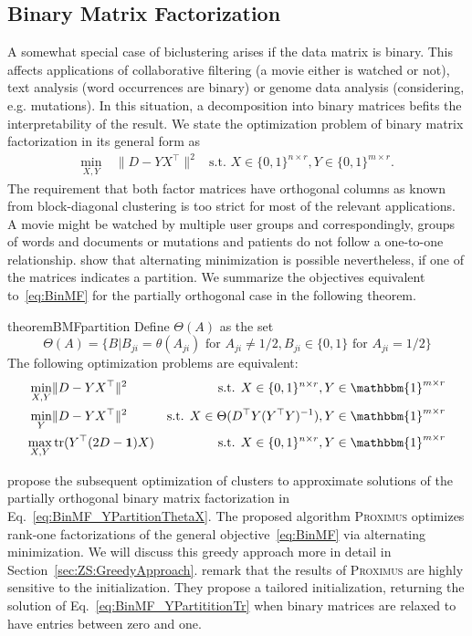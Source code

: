 \subsection{Binary Matrix Factorization}\label{sec:ZS:BinaryMF}
A somewhat special case of biclustering arises if the data matrix is binary. This affects applications of collaborative filtering (a movie either is watched or not), text analysis (word occurrences are binary) or genome data analysis (considering, e.g. mutations). In this situation, a decomposition into binary matrices befits the interpretability of the result. We state the optimization problem of binary matrix factorization in its general form as
\begin{align}\label{eq:BinMF}
\min_{X,Y}\ &\|D-YX^\top\|^2 & \text{s.t. } X\in\{0,1\}^{n\times r},Y\in\{0,1\}^{m\times r}. \tag{BiMF}
\end{align}
The requirement that both factor matrices have orthogonal columns as known from block-diagonal clustering is too strict for most of the relevant applications. A movie might be watched by multiple user groups and correspondingly, groups of words and documents or mutations and patients do not follow a one-to-one relationship. \cite{li2005general} show that alternating minimization is possible nevertheless, if one of the matrices indicates a partition. We summarize the objectives equivalent to~\eqref{eq:BinMF} for the partially orthogonal case in the following theorem.
\begin{restatable}{theorem}{BMFpartition}\label{thm:BMFpartition}
Define $\Theta(A)$ as the set
\[\Theta(A) = \{B| B_{ji}=\theta(A_{ji}) \text{ for } A_{ji}\neq 1/2, B_{ji}\in\{0,1\} \text{ for } A_{ji}=1/2 \}\]
The following optimization problems are equivalent:
\begin{align}
    \label{eq:BinMF_YPartition}
    \min_{X,Y}& \|D-YX^\top\|^2 & \text{s.t. } X\in\{0,1\}^{n\times r},Y\in\mathbbm{1}^{m\times r}\\
    \label{eq:BinMF_YPartitionThetaX}
    \min_{Y}& \|D-YX^\top\|^2 & \text{s.t. } X\in\Theta(D^\top Y(Y^\top Y)^{-1}),Y\in\mathbbm{1}^{m\times r}\\
    \label{eq:BinMF_YPartititionTr}
    \max_{X,Y}& \tr(Y^\top (2D-\mathbf{1})X) & \text{s.t. } X\in\{0,1\}^{n\times r},Y\in\mathbbm{1}^{m\times r}
\end{align}
\end{restatable}
\cite{koyuturk2003proximus} propose the subsequent optimization of clusters to approximate solutions of the partially orthogonal binary matrix factorization in Eq.~\eqref{eq:BinMF_YPartitionThetaX}. The proposed algorithm \textsc{Proximus} optimizes rank-one factorizations of the general objective~\eqref{eq:BinMF} via alternating minimization. We will discuss this greedy approach more in detail in Section~\ref{sec:ZS:GreedyApproach}.
\cite{shen2009mining} remark that the results of \textsc{Proximus} are highly sensitive to the initialization. They propose a tailored initialization, returning the solution of Eq.~\eqref{eq:BinMF_YPartititionTr} when binary matrices are relaxed to have entries between zero and one.

